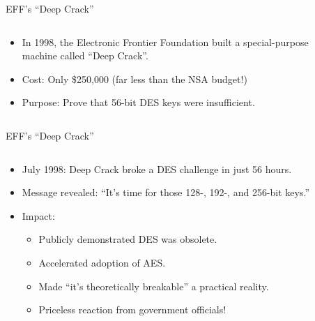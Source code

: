 \documentclass[aspectratio=169, lualatex, handout]{beamer}
\begin{document}
\begin{frame}{EFF's ``Deep Crack''}
	\begin{columns}[c]
		\begin{column}{0.6\textwidth}
			\begin{itemize}[<+->]
				\item In 1998, the Electronic Frontier Foundation built a special-purpose machine called ``Deep Crack''.
				\item Cost: Only \$250,000 (far less than the NSA budget!)
				\item Purpose: Prove that 56-bit DES keys were insufficient.
			\end{itemize}
		\end{column}
		\begin{column}{0.4\textwidth}
		\end{column}
	\end{columns}
\end{frame}

\begin{frame}{EFF's ``Deep Crack''}
	\begin{columns}[c]
		\begin{column}{0.6\textwidth}
			\begin{itemize}[<+->]
				\item July 1998: Deep Crack broke a DES challenge in just 56 hours.
				\item Message revealed: ``It's time for those 128-, 192-, and 256-bit keys.''
				\item Impact:
				      \begin{itemize}
					      \item Publicly demonstrated DES was obsolete.
					      \item Accelerated adoption of AES.
					      \item Made ``it's theoretically breakable'' a practical reality.
					      \item Priceless reaction from government officials!
				      \end{itemize}
			\end{itemize}
		\end{column}
		\begin{column}{0.4\textwidth}
		\end{column}
	\end{columns}
\end{frame}
\end{document}
